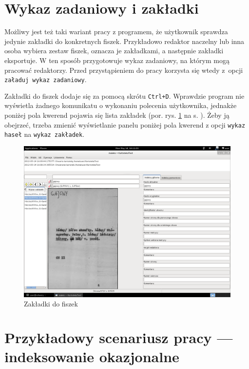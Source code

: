 \documentclass[12pt,oneside,notitlepage,titleauthor]{mwart}%
\begin{document}
\section{Wykaz zadaniowy i zakładki}



Możliwy jest też taki wariant pracy z programem, że użytkownik  sprawdza jedynie zakładki do konkretnych fiszek. Przykładowo redaktor naczelny lub inna osoba wybiera zestaw fiszek, oznacza je zakładkami, a następnie zakładki eksportuje. W ten sposób przygotowuje wykaz zadaniowy, na którym mogą pracować redaktorzy. Przed przystąpieniem do pracy korzysta się wtedy z~opcji \texttt{załaduj wykaz zadaniowy}.

Zakładki do fiszek dodaje się za pomocą skrótu \texttt{Ctrl+D}. Wprawdzie program nie wyświetla żadnego komunikatu o wykonaniu polecenia użytkownika, jednakże poniżej pola kwerend pojawia się lista zakładek (por. rys. \ref{zakladki2} na s. \pageref{zakladki2}). Żeby ją obejrzeć, trzeba zmienić wyświetlanie panelu poniżej pola kwerend z opcji \texttt{wykaz haseł} na \texttt{wykaz zakładek}.

\begin{figure}[h]
\includegraphics[scale=0.3]{zakladki2.png}
\caption{Zakładki do fiszek}
\label{zakladki2}
\end{figure}




\section{Przykładowy scenariusz pracy --- indeksowanie okazjonalne}
\end{document}
